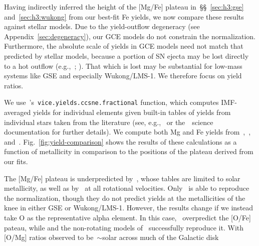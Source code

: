 \documentclass[foo.tex]{subfiles}
\begin{document}
{Having indirectly inferred the height of the [Mg/Fe] plateau
in~\S\S~\ref{sec:h3:gse} and~\ref{sec:h3:wukong} from our best-fit Fe yields,
we now compare these results against stellar models.
Due to the yield-outflow degeneracy (see Appendix~\ref{sec:degeneracy}), our
GCE models do not constrain the normalization.
Furthermore, the absolute scale of yields in GCE models need not match that
predicted by stellar models, because a portion of SN ejecta may be lost
directly to a hot outflow (e.g.,~\citealt*{Chisholm2018};
\citealt{Cameron2021}).
That which is lost may be substantial for low-mass systems like GSE and
especially Wukong/LMS-1.
We therefore focus on yield ratios.
\par
We use~\vice's~\texttt{vice.yields.ccsne.fractional} function, which computes
IMF-averaged yields for individual elements given built-in tables of yields
from individual stars taken from the literature (see,
e.g.,~\citealt{Griffith2022} or the~\vice~science documentation for further
details).
We compute both Mg and Fe yields from~\citet{Nomoto2013},~\citet{Sukhbold2016},
and~\citet{Limongi2018}.
Fig.~\ref{fig:yield-comparison} shows the results of these calculations as a
function of metallicity in comparison to the positions of the plateau derived
from our fits.
\par
The [Mg/Fe] plateau is underpredicted by~\citet{Sukhbold2016}, whose tables are
limited to solar metallicity, as well as by~\citet{Limongi2018} at all
rotational velocities.
Only~\citet{Nomoto2013} is able to reproduce the normalization, though they do
not predict yields at the metallicities of the knee in either GSE or
Wukong/LMS-1.
However, the results change if we instead take O as the representative alpha
element.
In this case,~\citet{Nomoto2013} overpredict the [O/Fe] pateau, while
\citet{Sukhbold2016} and the non-rotating models of~\citet{Limongi2018}
successfully reproduce it.
With [O/Mg] ratios observed to be~$\sim$solar across much of the Galactic disk
}
\end{document}
